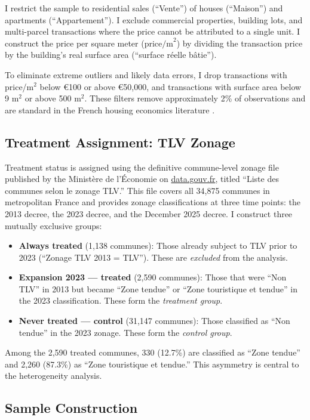 \documentclass[12pt]{article}
\begin{document}
I restrict the sample to residential sales (``Vente'') of houses (``Maison'') and apartments (``Appartement''). I exclude commercial properties, building lots, and multi-parcel transactions where the price cannot be attributed to a single unit. I construct the price per square meter ($\text{price/m}^2$) by dividing the transaction price by the building's real surface area (``surface r\'eelle b\^atie'').

To eliminate extreme outliers and likely data errors, I drop transactions with price/m$^2$ below \euro{100} or above \euro{50,000}, and transactions with surface area below 9 m$^2$ or above 500 m$^2$. These filters remove approximately 2\% of observations and are standard in the French housing economics literature \citep{combes2018}.

\subsection{Treatment Assignment: TLV Zonage}

Treatment status is assigned using the definitive commune-level zonage file published by the Minist\`ere de l'\'Economie on \url{data.gouv.fr}, titled ``Liste des communes selon le zonage TLV.'' This file covers all 34,875 communes in metropolitan France and provides zonage classifications at three time points: the 2013 decree, the 2023 decree, and the December 2025 decree. I construct three mutually exclusive groups:

\begin{itemize}
    \item \textbf{Always treated} (1,138 communes): Those already subject to TLV prior to 2023 (``Zonage TLV 2013 = TLV''). These are \textit{excluded} from the analysis.
    \item \textbf{Expansion 2023 --- treated} (2,590 communes): Those that were ``Non TLV'' in 2013 but became ``Zone tendue'' or ``Zone touristique et tendue'' in the 2023 classification. These form the \textit{treatment group}.
    \item \textbf{Never treated --- control} (31,147 communes): Those classified as ``Non tendue'' in the 2023 zonage. These form the \textit{control group}.
\end{itemize}

Among the 2,590 treated communes, 330 (12.7\%) are classified as ``Zone tendue'' and 2,260 (87.3\%) as ``Zone touristique et tendue.'' This asymmetry is central to the heterogeneity analysis.

\subsection{Sample Construction}
\end{document}

